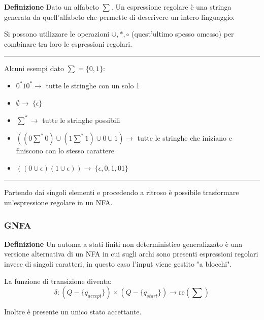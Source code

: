 \documentclass{article}
\begin{document}
\textbf{Definizione} Dato un alfabeto $\sum$. Un espressione regolare è una stringa generata da quell'alfabeto che permette di descrivere un intero linguaggio.\newline

\noindent Si possono utilizzare le operazioni $\cup,*,\circ$ (quest'ultimo spesso omesso) per combinare tra loro le espressioni regolari.

\noindent\rule{\textwidth}{0.5pt}\newline

\noindent Alcuni esempi dato $\sum=\{0,1\}$:
\begin{itemize}
    \item $0^*10^* \rightarrow$ tutte le stringhe con un solo 1

    \item $\emptyset\rightarrow \ \{\epsilon\}$ 

    \item $\sum^*\rightarrow $ tutte le stringhe possibili

    \item $((0\sum^* 0)\cup(1\sum^* 1)\cup0\cup1)\rightarrow$ tutte le stringhe che iniziano e finiscono con lo stesso carattere

    \item  $((0\cup\epsilon)(1\cup\epsilon))\rightarrow\ \{\epsilon,0,1,01\}$
    
\end{itemize}

\noindent\rule{\textwidth}{0.5pt}\newline

\noindent Partendo dai singoli elementi e procedendo a ritroso è possibile trasformare un'espressione regolare in un NFA.

\subsubsection{GNFA}

\textbf{Definizione} Un automa a stati finiti non deterministico generalizzato è una versione alternativa di un NFA in cui sugli archi sono presenti espressioni regolari invece di singoli caratteri, in questo caso l'input viene gestito "a blocchi".\newline

\noindent La funzione di transizione diventa: 
$$\delta:(Q-\{q_{accept}\})\times(Q-\{q_{start}\})\rightarrow \text{re}(\sum)$$\newline

\noindent Inoltre è presente un unico stato accettante.\newline
\end{document}
